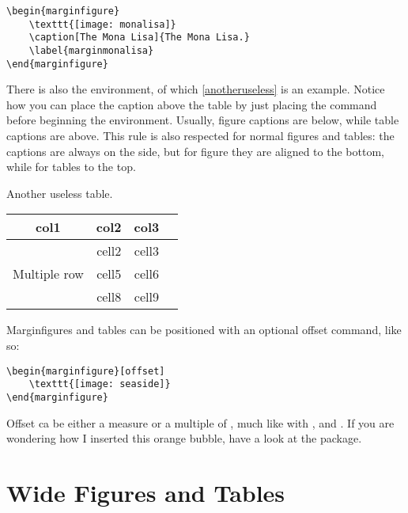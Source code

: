 \begin{lstlisting}[caption={Another caption.}]
\begin{marginfigure}
	\texttt{[image: monalisa]}
	\caption[The Mona Lisa]{The Mona Lisa.}
	\label{marginmonalisa}
\end{marginfigure}
\end{lstlisting}

There is also the  environment, of which 
\cref{anotheruseless} is an example. Notice how you can place the 
caption above the table by just placing the  command 
before beginning the  environment. Usually, figure 
captions are below, while table captions are above. This rule is also 
respected for normal figures and tables: the captions are always on the 
side, but for figure they are aligned to the bottom, while for tables to 
the top.

\begin{margintable}
\caption[Another useless table]{Another useless table.}
\label{anotheruseless}
\raggedright
\begin{tabular}{ c c c c }
	\hline
	col1 & col2 & col3 \\
	\hline
	\multirow{3}{4em}{Multiple row} & cell2 & cell3 \\ & cell5 & cell6 
	\\ & cell8 & cell9 \\ \hline
\end{tabular}
\end{margintable}

Marginfigures and tables can be positioned with an optional offset 
command, like so:

\begin{lstlisting}
\begin{marginfigure}[offset]
	\texttt{[image: seaside]}
\end{marginfigure}
\end{lstlisting}

Offset ca be either a measure or a multiple of , 
much like with ,  and 
. If you are wondering how I 
inserted this orange bubble, have a look at the  package.

\section{Wide Figures and Tables}

